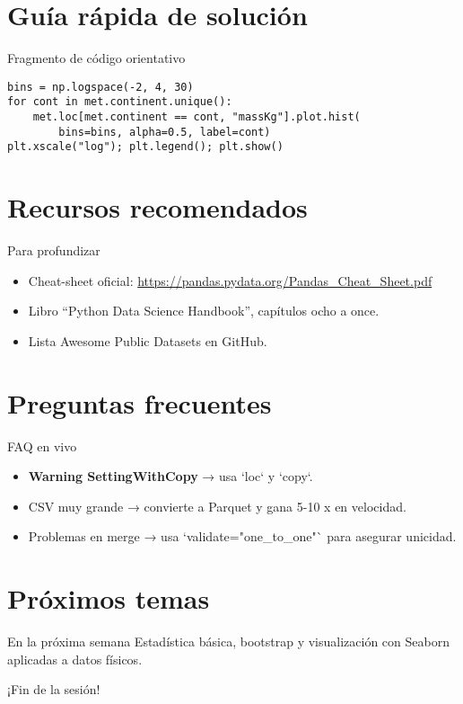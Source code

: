 \documentclass[10pt]{beamer}
\begin{document}
\section{Guía rápida de solución}
\begin{frame}[fragile,shrink=5]{Fragmento de código orientativo}
\begin{verbatim}
bins = np.logspace(-2, 4, 30)
for cont in met.continent.unique():
    met.loc[met.continent == cont, "massKg"].plot.hist(
        bins=bins, alpha=0.5, label=cont)
plt.xscale("log"); plt.legend(); plt.show()
\end{verbatim}
\end{frame}

\section{Recursos recomendados}
\begin{frame}{Para profundizar}
\begin{itemize}
  \item Cheat-sheet oficial: \url{https://pandas.pydata.org/Pandas_Cheat_Sheet.pdf}
  \item Libro “Python Data Science Handbook”, capítulos ocho a once.
  \item Lista Awesome Public Datasets en GitHub.
\end{itemize}
\end{frame}

\section{Preguntas frecuentes}
\begin{frame}{FAQ en vivo}
\begin{itemize}
 \item \textbf{Warning SettingWithCopy} → usa `loc` y `copy`.  
 \item CSV muy grande → convierte a Parquet y gana 5-10 x en velocidad.  
 \item Problemas en merge → usa `validate="one\_to\_one"` para asegurar unicidad.
\end{itemize}
\end{frame}

\section{Próximos temas}
\begin{frame}{En la próxima semana}
Estadística básica, bootstrap y visualización con Seaborn aplicadas a datos físicos.
\end{frame}

\begin{frame}\Huge{\centerline{¡Fin de la sesión!}}\end{frame}
\end{document}

